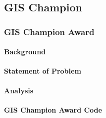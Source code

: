 \documentclass[class=book , crop=false]{standalone}
\title{}  %
\begin{document}

\ifstandalone
\maketitle %
\tableofcontents %
\clearpage
\fi

\subsection{GIS Champion}
\noindent \blindtext
\subsubsection{GIS Champion Award}
\begin{multicols}{2}
%
\paragraph{Background}
%
\noindent \blindtext
%
\paragraph{Statement of Problem}
\noindent \blindtext
%
\paragraph{Analysis}
\noindent \blindtext

\end{multicols}

\clearpage

%
%
\paragraph{GIS Champion Award Code}
\vspace{.2in}
\end{document}
